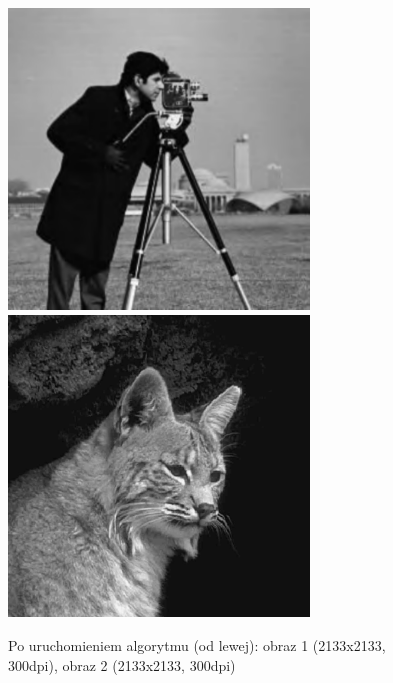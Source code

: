 \documentclass[a4paper,12pt]{book}
\begin{document}
\begin{figure}
	\caption{Po uruchomieniem algorytmu (od lewej): obraz 1 (2133x2133, 300dpi), obraz 2 (2133x2133, 300dpi)}
	\includegraphics[width=8cm, height=8cm]{man-rastar-unification.png}
	\includegraphics[width=8cm, height=8cm]{cat-unmodified.jpg}
\end{figure}
\end{document}

